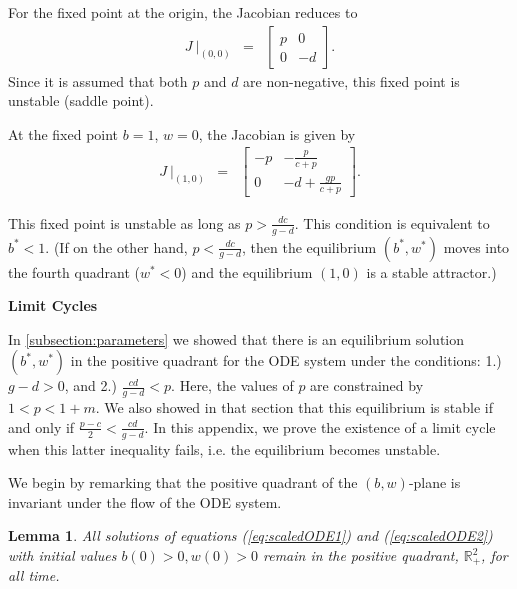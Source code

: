 \documentclass[review,authoryear]{elsarticle}
\newtheorem{lemma}[theorem]{Lemma}
\begin{document}
For the fixed point at the origin, the Jacobian reduces to 
\begin{eqnarray*}
  J~\bigg|_{(0,0)} & = & \left[
          \begin{array}{rr}
            p & 0 \\
            0 & -d
          \end{array}
          \right].
\end{eqnarray*}
Since it is assumed that both $p$ and $d$ are non-negative, this fixed point  is unstable  (saddle point).



At the fixed point $b=1$, $w=0$, the Jacobian is given by 
\begin{eqnarray*}
  J~\bigg|_{(1,0)} & = & \left[
          \begin{array}{cc}
            -p & -\frac{p}{c+p} \\
            0 & -d+\frac{gp}{c+p}
          \end{array}
          \right].
\end{eqnarray*}

This fixed point is unstable as long as $p >\frac{dc}{g-d}$.  This condition is equivalent to $b^* < 1$.  (If on the other hand, $p <\frac{dc}{g-d}$, then the equilibrium $(b^*,w^*)$ moves into the fourth quadrant ($w^*<0$) and the equilibrium $(1,0)$ is a stable attractor.)


\noindent
\textbf{Limit Cycles}

In \ref{subsection:parameters} we showed that there is an equilibrium solution $(b^*,w^*)$ in the positive quadrant for the ODE system under the conditions:  1.)  $g-d>0$, and 2.) $\frac{cd}{g-d}<p$.   Here, the values of  $p$ are constrained by $1<p<1+m$.   We also showed in that section that this 
equilibrium is stable if and only if $\frac{p-c}{2} < \frac{cd}{g-d}.$   In this appendix, we prove the existence of a limit cycle when this latter inequality fails, i.e. the equilibrium becomes unstable.

We begin by remarking that the positive quadrant of the $(b,w)$-plane is invariant under the flow of the ODE system.

\begin{lemma}


All solutions of equations (\ref{eq:scaledODE1}) and
  (\ref{eq:scaledODE2}) with initial values
  $b\left( 0\right) > 0 ,w\left( 0\right) >0$ remain in the positive quadrant, $\mathbb R_+^2$, for all time.
\end{lemma}
\end{document}
